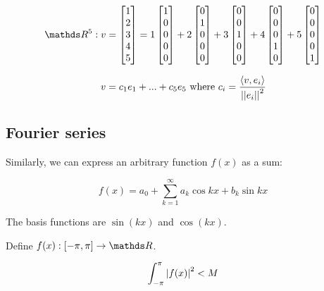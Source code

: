 \[
  \bbR^5 : v = \begin{bmatrix}
    1 \\ 2 \\ 3 \\ 4 \\ 5
  \end{bmatrix} = 
  1 \begin{bmatrix} 1 \\ 0 \\ 0 \\ 0 \\ 0  \end{bmatrix} +
  2 \begin{bmatrix} 0 \\ 1 \\ 0 \\ 0 \\ 0 \end{bmatrix} +
  3 \begin{bmatrix} 0 \\ 0 \\ 1 \\ 0 \\ 0 \end{bmatrix} +
  4 \begin{bmatrix} 0 \\ 0 \\ 0 \\ 1 \\ 0 \end{bmatrix} +
  5 \begin{bmatrix} 0 \\ 0 \\ 0 \\ 0 \\ 1 \end{bmatrix}
\]

\[
  v = c_1 e_1 + ... + c_5 e_5 \text{ where } c_i = {\langle v, e_i \rangle \over \left|\left|e_i\right|\right|^2}
\]

\subsection{Fourier series}

Similarly, we can express an arbitrary function $f(x)$ as a sum:

\[
  f(x) = a_0 + \sum_{k=1}^\infty a_k \cos{kx} + b_k \sin{kx}
\]

The basis functions are $\sin(kx)$ and $\cos(kx)$.

Define $f(x) : [-\pi,\pi] \to \bbR$.

\[
  \int_{-\pi}^\pi \left|f(x)\right|^2 < M
\]

